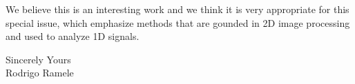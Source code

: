 \documentclass[12pt]{letter} %
\begin{document}
\begin{letter}{ }
We believe this is an interesting work and we think it is very appropriate for this special issue, which emphasize methods that are gounded in 2D image processing and used to analyze 1D signals.
		
Sincerely Yours \\
Rodrigo Ramele
		
		
	\end{letter}
	
\end{document}
